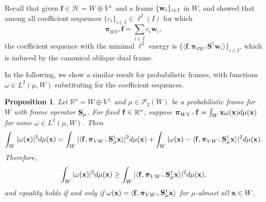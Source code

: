 \documentclass{amsart}
\numberwithin{equation}{section}
\newcommand{\bpi}{{\boldsymbol{\pi}}}
\theoremstyle{plain}
\newtheorem{proposition}[theorem]{Proposition}
\theoremstyle{remark}
\theoremstyle{definition}
\begin{document}
Recall that given $\mathbf{f} \in \mathcal{H} =W \oplus V^\perp$ and a frame $\{{\bf w}_i\}_{i \in I}$ in $W$, \cite[Proposition~4]{eldar2003sampling} and \cite[Proposition~5.1]{eldar2005general} showed that among all coefficient sequences $\{c_i\}_{i \in I} \in \ell^2(I)$ for which 
$$\bpi_{WV^\perp} \mathbf{f} = \sum_{i \in I} c_i \mathbf{w}_i,$$
the coefficient sequence with the minimal $\ell^2$ energy is $ \{\langle \mathbf{f}, \bpi_{VW^\perp} \mathbf{S}^\dagger \mathbf{w}_i \rangle \}_{i \in I}$, which is induced by the canonical oblique dual frame.  

In the following, we show a similar result for probabilistic frames, with functions $\omega \in L^2(\mu, W)$ substituting for the coefficient sequences.


\begin{proposition}\label{ObliqueDualEnergy}
Let $\mathbb{R}^n = W \oplus V^\perp$ and $\mu \in \mathcal{P}_2(W)$ be a probabilistic frame for $W$ with frame operator ${\bf S}_\mu$. For fixed ${\bf f} \in \mathbb{R}^n$, suppose $\bpi_{WV^\perp}{\bf f} = \int_{W} {\bf x} \omega({\bf x}) d\mu({\bf x})$ for some $\omega \in L^2(\mu, W)$. Then 
   \begin{equation*}
       \int_{W} |\omega({\bf x})|^2 d\mu({\bf x}) =  \int_{W} |\langle {\bf f}, \bpi_{VW^\perp}{\bf S}_\mu^{\dagger}{\bf x} \rangle|^2  d\mu({\bf x}) + \int_{W} \vert \omega({\bf x})-\langle {\bf f}, \bpi_{VW^\perp}{\bf S}_\mu^{\dagger}{\bf x} \rangle \vert^2 d\mu({\bf x}).
    \end{equation*}
   Therefore, 
    \begin{equation*}
       \int_{W} |\omega({\bf x})|^2 d\mu({\bf x}) \geq  \int_{W} |\langle {\bf f}, \bpi_{VW^\perp}{\bf S}_\mu^{\dagger}{\bf x} \rangle|^2  d\mu({\bf x}),
    \end{equation*}
   and equality holds if and only if $\omega ({\bf x}) = \langle {\bf f}, \bpi_{VW^\perp}{\bf S}_\mu^{\dagger}{\bf x} \rangle$ for $\mu$-almost all ${\bf x} \in W$. 
\end{proposition}
\end{document}
